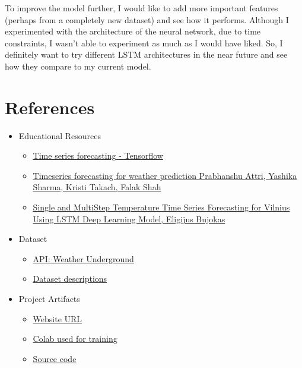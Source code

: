 \documentclass[paper=a4, fontsize=11pt, margin=1in]{scrartcl}
\numberwithin{equation}{section}		%
\numberwithin{figure}{section}			%
\numberwithin{table}{section}				%
\begin{document}
To improve the model further, I would like to add more important features (perhaps from a completely new dataset) and see how it performs. Although I experimented with the architecture of the neural network, due to time constraints, I wasn't able to experiment as much as I would have liked. So, I definitely want to try different LSTM architectures in the near future and see how they compare to my current model.

\section{\textbf{References}}

\begin{itemize}
    \item Educational Resources 
        \begin{itemize}
            \item \href{https://www.tensorflow.org/tutorials/structured_data/time_series#multi-step_models}{Time series forecasting - Tensorflow}
            \item \href{https://keras.io/examples/timeseries/timeseries_weather_forecasting/}{Timeseries forecasting for weather prediction \- Prabhanshu Attri, Yashika Sharma, Kristi Takach, Falak Shah}
        
            \item \href{https://towardsdatascience.com/single-and-multi-step-temperature-time-series-forecasting-for-vilnius-using-lstm-deep-learning-b9719a0009de}{Single and Multi\-Step Temperature Time Series Forecasting for Vilnius Using LSTM Deep Learning Model, Eligijus Bujokas}
        \end{itemize}
    \item Dataset
        \begin{itemize}
            \item \href{https://www.wunderground.com/}{API: Weather Underground}
            \item \href{https://www.worldcommunitygrid.org/lt/images/climate/The_Weather_Company_APIs.pdf}{Dataset descriptions}
        \end{itemize}
    \item Project Artifacts
        \begin{itemize}
            \item \href{http://3.235.0.237/#/dashboard}{Website URL}
            \item \href{https://colab.research.google.com/drive/1G6E8fT-viMPYw1fnWnBho2ONFfIyAXbK#scrollTo=ykqO9SfV9t7x}{Colab used for training}
            \item \href{https://github.com/00ber/ml-weather-prediction}{Source code}
        \end{itemize}
\end{itemize}

\end{document}
